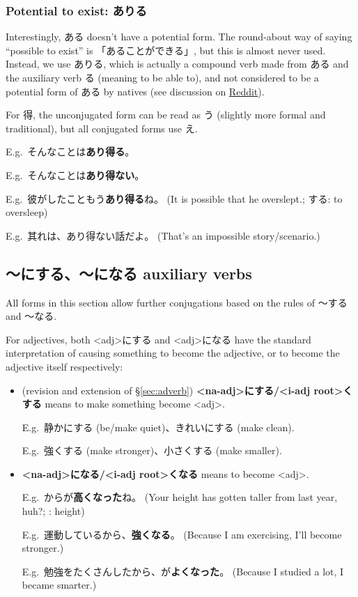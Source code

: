 \documentclass[../nihongo-gakushuu-kyouzai.tex]{subfiles}
\begin{document}
\subsubsection{Potential to exist: ありる} \label{sec:potential-to-exist-arieru}
Interestingly, ある doesn't have a potential form. The round-about way of saying ``possible to exist'' is 「あることができる」, but this is almost never used. Instead, we use ありる, which is actually a compound verb made from ある and the auxiliary verb る (meaning to be able to), and not considered to be a potential form of ある by natives (see discussion on \href{https://www.reddit.com/r/LearnJapanese/comments/2wostw/potential\_\%E3\%81\%82\%E3\%82\%8B\_and\_\%E3\%81\%84\%E3\%82\%8B/}{Reddit}).

For 得, the unconjugated form can be read as う (slightly more formal and traditional), but all conjugated forms use え. 

E.g.\ そんなことは\textbf{あり得る}。

E.g.\ そんなことは\textbf{あり得ない}。

E.g.\ 彼がしたこともう\textbf{あり得る}ね。 (It is possible that he overslept.; する: to oversleep)

E.g.\ 其れは、あり得ない話だよ。 (That's an impossible story/scenario.)

\subsection{〜にする、〜になる auxiliary verbs} \label{sec:auxiliary-verbs-nisuru-ninaru}
All forms in this section allow further conjugations based on the rules of 〜する and 〜なる.

For adjectives, both <adj>にする and <adj>になる have the standard interpretation of causing something to become the adjective, or to become the adjective itself respectively:
\begin{itemize}
    \item (revision and extension of \S\ref{sec:adverb}) \textbf{<na-adj>にする/<i-adj root>くする} means to make something become <adj>.

    E.g.\ 静かにする (be/make quiet)、きれいにする (make clean).

    E.g.\ 強くする (make stronger)、小さくする (make smaller).
    \item \textbf{<na-adj>になる/<i-adj root>くなる} means to become <adj>.

    E.g.\ からが\textbf{高くなった}ね。 (Your height has gotten taller from last year, huh?; : height)

    E.g.\ 運動しているから、\textbf{強くなる}。 (Because I am exercising, I'll become stronger.)

    E.g.\ 勉強をたくさんしたから、が\textbf{よくなった}。 (Because I studied a lot, I became smarter.)
\end{itemize}
\end{document}

